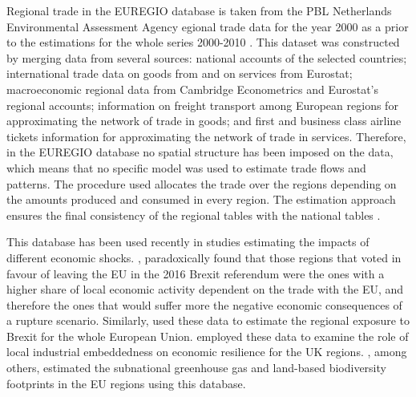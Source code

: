 \documentclass[]{interact}
\theoremstyle{plain}%
\theoremstyle{definition}
\theoremstyle{remark}
\begin{document}
Regional trade in the EUREGIO database is taken from the PBL Netherlands
Environmental Assessment Agency egional trade data for the year 2000 as
a prior to the estimations for the whole series 2000-2010 \citep[ and
\citet{thissen2013european}]{thissen2013integrated}. This dataset was
constructed by merging data from several sources: national accounts of
the selected countries; international trade data on goods from
\citep{feenstra2005world} and on services from Eurostat; macroeconomic
regional data from Cambridge Econometrics and Eurostat's regional
accounts; information on freight transport among European regions for
approximating the network of trade in goods; and first and business
class airline tickets information for approximating the network of trade
in services. Therefore, in the EUREGIO database no spatial structure has
been imposed on the data, which means that no specific model was used to
estimate trade flows and patterns. The procedure used allocates the
trade over the regions depending on the amounts produced and consumed in
every region. The estimation approach ensures the final consistency of
the regional tables with the national tables
\citep{thissen2018euregio, ivanova2019regional}.

This database has been used recently in studies estimating the impacts
of different economic shocks. \citet{los2017mismatch}, paradoxically
found that those regions that voted in favour of leaving the EU in the
2016 Brexit referendum were the ones with a higher share of local
economic activity dependent on the trade with the EU, and therefore the
ones that would suffer more the negative economic consequences of a
rupture scenario. Similarly, \citet{chen2018continental} used these data
to estimate the regional exposure to Brexit for the whole European
Union. \citet{kitsos2019role} employed these data to examine the role of
local industrial embeddedness on economic resilience for the UK regions.
\citet{wilting2020subnational}, among others, estimated the subnational
greenhouse gas and land-based biodiversity footprints in the EU regions
using this database.
\end{document}
